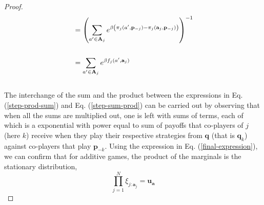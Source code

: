 \documentclass[11pt]{article}
\theoremstyle{plainCl1}
\theoremstyle{plainCl2}
\newcommand{\A}{\mathbf{A}}
\newcommand{\abf}{\mathbf{a}}
\newcommand{\qbf}{\mathbf{q}}
\newcommand{\pbf}{\mathbf{p}}
\newcommand{\ubf}{\mathbf{u}}
\begin{document}
\begin{proof}
\begin{align}
&= \left( \sum_{a' \in \A_j} \displaystyle e^{\beta \left( \pi_j(a',\pbf_{-j}) - \pi_j(\abf_j,\pbf_{-j})\right)} \right)^{-1}\\ \notag \\
\label{final-expression}
&= \sum_{a' \in \A_j} \displaystyle e^{\beta f_j(a',\abf_j)}
\end{align} \\
\noindent The interchange of the sum and the product between the expressions in Eq. (\ref{step-prod-sum}) and Eq. (\ref{step-sum-prod}) can be carried out by observing that when all the sums are multiplied out, one is left with sums of terms, each of which is a exponential with power equal to sum of payoffs that co-players of $j$ (here $k$) receive when they play their respective strategies from $\qbf$ (that is $\qbf_k$) against co-players that play $\pbf_{-k}$. Using the expression in Eq. (\ref{final-expression}), we can confirm that for additive games, the product of the marginals is the stationary distribution,  
\begin{equation}
\prod_{j=1}^N \xi_{j:\abf_j} = \ubf_\abf
\end{equation} 
\end{proof}
\end{document}
